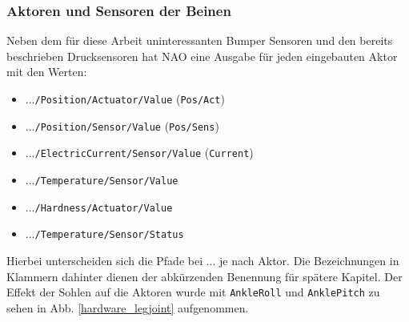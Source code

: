 \subsubsection*{Aktoren und Sensoren der Beinen}
Neben dem für diese Arbeit uninteressanten Bumper Sensoren und den bereits beschrieben Drucksensoren hat NAO eine Ausgabe für jeden eingebauten Aktor mit den Werten:
\begin{itemize}
	\item ...\texttt{/Position/Actuator/Value} (\texttt{Pos/Act})
	\item ...\texttt{/Position/Sensor/Value} (\texttt{Pos/Sens})
	\item ...\texttt{/ElectricCurrent/Sensor/Value} (\texttt{Current})
	\item ...\texttt{/Temperature/Sensor/Value}
	\item ...\texttt{/Hardness/Actuator/Value} 
	\item ...\texttt{/Temperature/Sensor/Status} 
\end{itemize}
Hierbei unterscheiden sich die Pfade bei \glqq ...\grqq{} je nach Aktor. Die Bezeichnungen in Klammern dahinter dienen der abkürzenden Benennung für spätere Kapitel. Der Effekt der Sohlen auf die Aktoren wurde mit \texttt{AnkleRoll} und \texttt{AnklePitch} zu sehen in Abb. \ref{hardware_legjoint} aufgenommen.

